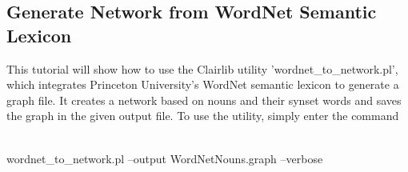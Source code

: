 \subsection{Generate Network from WordNet Semantic Lexicon}
This tutorial will show how to use the Clairlib utility 'wordnet\_to\_network.pl', which integrates Princeton University's WordNet semantic lexicon to generate a graph file. It creates a network based on nouns and their synset words and saves the graph in the given output file. To use the utility, simply enter the command
\\
\\
\begin{boxedverbatim}
wordnet_to_network.pl --output WordNetNouns.graph --verbose
\end{boxedverbatim}
